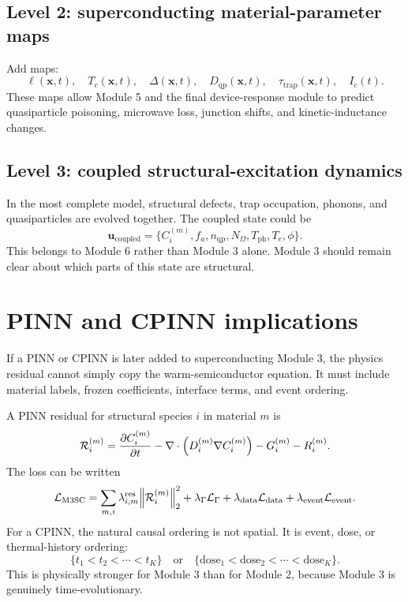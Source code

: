 \documentclass[11pt]{article}
\newcommand{\x}{\mathbf{x}}
\begin{document}
\subsection{Level 2: superconducting material-parameter maps}

Add maps:
\begin{equation}
\ell(\x,t),\quad T_c(\x,t),\quad \Delta(\x,t),\quad D_{\mathrm{qp}}(\x,t),\quad \tau_{\mathrm{trap}}(\x,t),\quad I_c(t).
\end{equation}
These maps allow Module 5 and the final device-response module to predict quasiparticle poisoning, microwave loss, junction shifts, and kinetic-inductance changes.

\subsection{Level 3: coupled structural-excitation dynamics}

In the most complete model, structural defects, trap occupation, phonons, and quasiparticles are evolved together. The coupled state could be
\begin{equation}
\mathbf{u}_{\mathrm{coupled}}=\{C_i^{(m)},f_a,n_{\mathrm{qp}},N_{\Omega},T_{\mathrm{ph}},T_e,\phi\}.
\end{equation}
This belongs to Module 6 rather than Module 3 alone. Module 3 should remain clear about which parts of this state are structural.

\section{PINN and CPINN implications}

If a PINN or CPINN is later added to superconducting Module 3, the physics residual cannot simply copy the warm-semiconductor equation. It must include material labels, frozen coefficients, interface terms, and event ordering.

A PINN residual for structural species $i$ in material $m$ is
\begin{equation}
\mathcal{R}_{i}^{(m)}
=\pdv{C_i^{(m)}}{t}
-\nabla\cdot\left(D_i^{(m)}\nabla C_i^{(m)}\right)
-G_i^{(m)}-R_i^{(m)}.
\label{eq:pinn_residual_m3_sc}
\end{equation}
The loss can be written
\begin{equation}
\mathcal{L}_{\mathrm{M3SC}}
=\sum_{m,i}\lambda_{i,m}^{\mathrm{res}}\norm{\mathcal{R}_{i}^{(m)}}_2^2
+\lambda_{\Gamma}\mathcal{L}_{\Gamma}
+\lambda_{\mathrm{data}}\mathcal{L}_{\mathrm{data}}
+\lambda_{\mathrm{event}}\mathcal{L}_{\mathrm{event}}.
\label{eq:pinn_loss_m3_sc}
\end{equation}
For a CPINN, the natural causal ordering is not spatial. It is event, dose, or thermal-history ordering:
\begin{equation}
\{t_1<t_2<\cdots<t_K\}\quad \text{or}\quad \{\mathrm{dose}_1<\mathrm{dose}_2<\cdots<\mathrm{dose}_K\}.
\end{equation}
This is physically stronger for Module 3 than for Module 2, because Module 3 is genuinely time-evolutionary.
\end{document}
